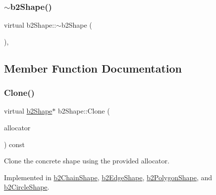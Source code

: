 \subsubsection{\texorpdfstring{$\sim$b2Shape()}{~b2Shape()}}
{\footnotesize\ttfamily virtual b2\+Shape\+::$\sim$b2\+Shape (\begin{DoxyParamCaption}{ }\end{DoxyParamCaption})\hspace{0.3cm}{\ttfamily [inline]}, {\ttfamily [virtual]}}



\subsection{Member Function Documentation}
\mbox{\label{classb2_shape_a4716243454bb9cf7c7ee1d9cb23ae634}} 
\subsubsection{\texorpdfstring{Clone()}{Clone()}}
{\footnotesize\ttfamily virtual \mbox{\hyperlink{classb2_shape}{b2\+Shape}}$\ast$ b2\+Shape\+::\+Clone (\begin{DoxyParamCaption}\item[{\mbox{\hyperlink{classb2_block_allocator}{b2\+Block\+Allocator}} $\ast$}]{allocator }\end{DoxyParamCaption}) const\hspace{0.3cm}{\ttfamily [pure virtual]}}



Clone the concrete shape using the provided allocator. 



Implemented in \mbox{\hyperlink{classb2_chain_shape_a03d2ea80168d29c553fa21b5a821e6d8}{b2\+Chain\+Shape}}, \mbox{\hyperlink{classb2_edge_shape_a52ed696717f44ed02b7a88ccf201563c}{b2\+Edge\+Shape}}, \mbox{\hyperlink{classb2_polygon_shape_ae2c2343be33db465f7e83db2061fdd51}{b2\+Polygon\+Shape}}, and \mbox{\hyperlink{classb2_circle_shape_a5ff8fbab7dff87784fbff20b07e55cfc}{b2\+Circle\+Shape}}.

\mbox{\label{classb2_shape_a88e9807fab0c8ca9a98d8926e50a1411}} 
